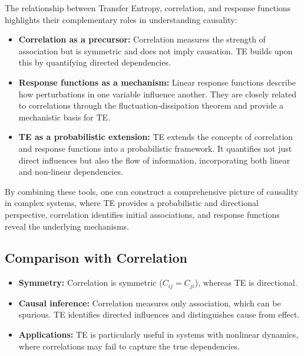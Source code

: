 \documentclass[English, Lau, oneside]{sapthesis}
\begin{document}
\noindent The relationship between Transfer Entropy, correlation, and response functions highlights their complementary roles in understanding causality:
\begin{itemize}
    \item \textbf{Correlation as a precursor:} Correlation measures the strength of association but is symmetric and does not imply causation. TE builds upon this by quantifying directed dependencies.
    \item \textbf{Response functions as a mechanism:} Linear response functions describe how perturbations in one variable influence another. They are closely related to correlations through the fluctuation-dissipation theorem and provide a mechanistic basis for TE.
    \item \textbf{TE as a probabilistic extension:} TE extends the concepts of correlation and response functions into a probabilistic framework. It quantifies not just direct influences but also the flow of information, incorporating both linear and non-linear dependencies.
\end{itemize}

By combining these tools, one can construct a comprehensive picture of causality in complex systems, where TE provides a probabilistic and directional perspective, correlation identifies initial associations, and response functions reveal the underlying mechanisms.

\subsection{Comparison with Correlation}
\begin{itemize}
    \item \textbf{Symmetry:} Correlation is symmetric (\(C_{ij} = C_{ji}\)), whereas TE is directional.
    \item \textbf{Causal inference:} Correlation measures only association, which can be spurious. TE identifies directed influences and distinguishes cause from effect.
    \item \textbf{Applications:} TE is particularly useful in systems with nonlinear dynamics, where correlations may fail to capture the true dependencies.
\end{itemize}
\end{document}
